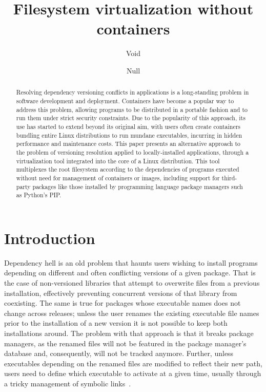 \documentclass[sigplan, anonymous, 10pt]{acmart}
\begin{document}
\title{Filesystem virtualization without containers}

\author{Void}

\author{Null}

\renewcommand{\shortauthors}{Void et al.}

\begin{abstract}
Resolving dependency versioning conflicts in applications is a long-standing problem in
software development and deployment. Containers have become a popular way to address this
problem, allowing programs to be distributed in a portable fashion and to run them under strict
security constraints. Due to the popularity of this approach, its use has started to extend
beyond its original aim, with users often create containers bundling entire Linux distributions
to run mundane executables, incurring in hidden performance and maintenance costs.
This paper presents an alternative approach to the problem of versioning resolution applied
to locally-installed applications, through a virtualization tool integrated into the core
of a Linux distribution. This tool multiplexes the root filesystem according to the
dependencies of programs executed without need for management of containers or images,
including support for third-party packages like those installed by programming language
package managers such as Python's PIP.
\end{abstract}

\maketitle

\section{Introduction}
Dependency hell is an old problem that haunts users wishing to install programs depending on
different and often conflicting versions of a given package. That is the case of non-versioned
libraries that attempt to overwrite files from a previous installation, effectively preventing
concurrent versions of that library from coexisting. The same is true for packages whose executable
names does not change across releases; unless the user renames the existing executable file names
prior to the installation of a new version it is not possible to keep both installations around.
The problem with that approach is that it breaks package managers, as the renamed files will not
be featured in the package manager's database and, consequently, will not be tracked anymore. Further, 
unless executables depending on the renamed files are modified to reflect their new path, users need
to define which executable to activate at a given time, usually through a tricky management of
symbolic links~\cite{RHEL?}.
\end{document}
